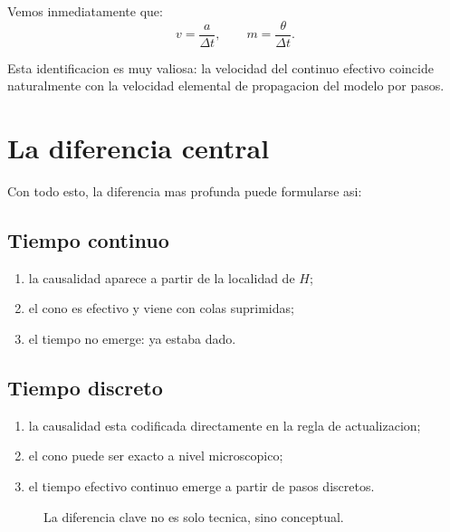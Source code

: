 Vemos inmediatamente que:
\begin{equation}
v = \frac{a}{\Delta t},
\qquad
m = \frac{\theta}{\Delta t}.
\end{equation}

Esta identificacion es muy valiosa: la velocidad del continuo efectivo coincide naturalmente con la velocidad elemental de propagacion del modelo por pasos.

\section{La diferencia central}
Con todo esto, la diferencia mas profunda puede formularse asi:

\subsection{Tiempo continuo}
\begin{enumerate}[label=\arabic*.]
    \item la causalidad aparece a partir de la localidad de \(H\);
    \item el cono es efectivo y viene con colas suprimidas;
    \item el tiempo no emerge: ya estaba dado.
\end{enumerate}

\subsection{Tiempo discreto}
\begin{enumerate}[label=\arabic*.]
    \item la causalidad esta codificada directamente en la regla de actualizacion;
    \item el cono puede ser exacto a nivel microscopico;
    \item el tiempo efectivo continuo emerge a partir de pasos discretos.
\end{enumerate}

\begin{figure}[h!]
\centering
{}
\caption{La diferencia clave no es solo tecnica, sino conceptual.}
\end{figure}

